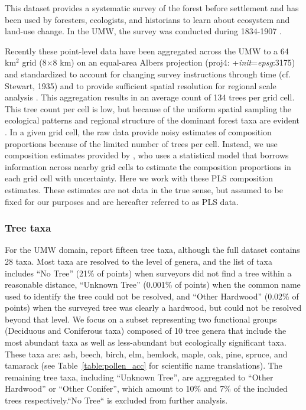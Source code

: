 \documentclass[12pt]{article}
\begin{document}
This dataset provides a systematic survey of the forest before
settlement and has been used by foresters, ecologists, and historians
to learn about ecosystem and land-use change. In the UMW, the survey
was conducted during 1834-1907 \citep{stewart1935public}.

Recently these point-level data have been aggregated across the UMW to
a 64 km$^2$ grid (8$\times$8 km) on an equal-area Albers projection
(proj4: +\textit{init}=\textit{epsg}:3175) and standardized to account
for changing survey instructions through time (cf. Stewart, 1935) and
to provide sufficient spatial resolution for regional scale analysis
\citep{goring_witness}.  This aggregation results in an average count
of 134 trees per grid cell. This tree count per cell is low, but
because of the uniform spatial sampling the ecological patterns and
regional structure of the dominant forest taxa are evident
\citep{goring_witness}. In a given grid cell, the raw data provide
noisy estimates of composition proportions because of the limited
number of trees per cell. Instead, we use composition estimates
provided by \citet{paciorek2015}, who uses a statistical model that
borrows information across nearby grid cells to estimate the
composition proportions in each grid cell with uncertainty. Here we
work with these PLS composition estimates. These estimates are not
data in the true sense, but assumed to be fixed for our purposes and
are hereafter referred to as PLS data.

\subsubsection{Tree taxa}

For the UMW domain, \citet{goring_witness} report fifteen tree taxa,
although the full dataset contains 28 taxa.  Most taxa are resolved to
the level of genera, and the list of taxa includes ``No Tree'' (21\%
of points) when surveyors did not find a tree within a reasonable
distance, ``Unknown Tree'' (0.001\% of points) when the common name
used to identify the tree could not be resolved, and ``Other
Hardwood'' (0.02\% of points) when the surveyed tree was clearly a
hardwood, but could not be resolved beyond that level. We focus on a
subset representing two functional groups (Deciduous and Coniferous
taxa) composed of 10 tree genera that include the most abundant taxa
as well as less-abundant but ecologically significant taxa. These taxa
are: ash, beech, birch, elm, hemlock, maple, oak, pine, spruce, and
tamarack (see Table~\ref{table:pollen_acc} for scientific name
translations). The remaining tree taxa, including ``Unknown Tree'',
are aggregated to ``Other Hardwood'' or ``Other Conifer'', which
amount to 10\% and 7\% of the included trees respectively.``No Tree``
is excluded from further analysis.
\end{document}
